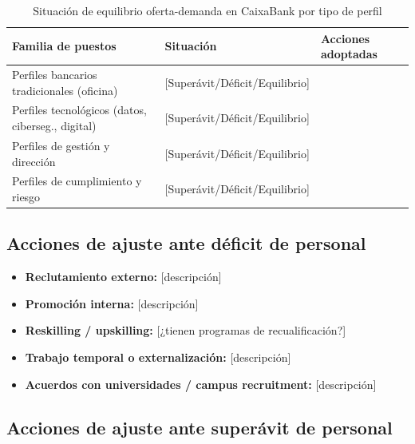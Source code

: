 \begin{table}[H]
  \centering
  \small
  \caption{Situación de equilibrio oferta-demanda en CaixaBank por tipo de perfil}
  \begin{tabularx}{\textwidth}{p{} p{} X}
    \toprule
    \textbf{Familia de puestos}    & \textbf{Situación} & \textbf{Acciones adoptadas} \\
    \midrule
    Perfiles bancarios tradicionales (oficina) & [Superávit/Déficit/Equilibrio] & \\
    Perfiles tecnológicos (datos, ciberseg., digital) & [Superávit/Déficit/Equilibrio] & \\
    Perfiles de gestión y dirección  & [Superávit/Déficit/Equilibrio] & \\
    Perfiles de cumplimiento y riesgo & [Superávit/Déficit/Equilibrio] & \\
    \bottomrule
  \end{tabularx}
\end{table}

\subsection{Acciones de ajuste ante déficit de personal}


\begin{itemize}
  \item \textbf{Reclutamiento externo:} [descripción]
  \item \textbf{Promoción interna:} [descripción]
  \item \textbf{Reskilling / upskilling:} [¿tienen programas de recualificación?]
  \item \textbf{Trabajo temporal o externalización:} [descripción]
  \item \textbf{Acuerdos con universidades / campus recruitment:} [descripción]
\end{itemize}

\subsection{Acciones de ajuste ante superávit de personal}


